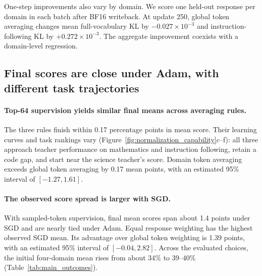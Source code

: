 One-step improvements also vary by domain. We score one held-out response per domain in each batch after BF16 writeback. At update 250, global token averaging changes mean full-vocabulary KL by $-0.027\times10^{-3}$ and instruction-following KL by $+0.272\times10^{-3}$. The aggregate improvement coexists with a domain-level regression.



\subsection{Final scores are close under Adam, with different task trajectories}

\paragraph{Top-64 supervision yields similar final means across averaging rules.}
The three rules finish within 0.17 percentage points in mean score. Their learning curves and task rankings vary (Figure~\ref{fig:normalization_capability}c--f): all three approach teacher performance on mathematics and instruction following, retain a code gap, and start near the science teacher's score. Domain token averaging exceeds global token averaging by 0.17 mean points, with an estimated 95\% interval of $[-1.27,1.61]$.


\paragraph{The observed score spread is larger with SGD.}
With sampled-token supervision, final mean scores span about 1.4 points under SGD and are nearly tied under Adam. Equal response weighting has the highest observed SGD mean. Its advantage over global token weighting is 1.39 points, with an estimated 95\% interval of $[-0.04,2.82]$. Across the evaluated choices, the initial four-domain mean rises from about 34\% to 39--40\% (Table~\ref{tab:main_outcomes}).

\FloatBarrier
